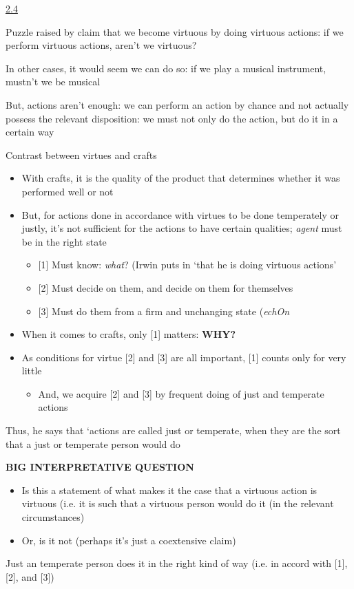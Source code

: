 \documentclass[11pt]{article}
\begin{document}
\noindent\underline{2.4}
\vspace*{2mm}

\noindent Puzzle raised by claim that we become virtuous by doing virtuous actions: if we perform virtuous actions, aren't we virtuous?
\vspace*{2mm}

\noindent In other cases, it would seem we can do so: if we play a musical instrument, mustn't we be musical
\vspace*{2mm}

\noindent But, actions aren't enough: we can perform an action by chance and not actually possess the relevant disposition: we must not only do the action, but do it in a certain way
\vspace*{2mm}

\noindent Contrast between virtues and crafts

\begin{itemize}\item{With crafts, it is the quality of the product that determines whether it was performed well or not}\item{But, for actions done in accordance with virtues to be done temperately or justly, it's not sufficient for the actions to have certain qualities; \emph{agent} must be in the right state}\begin{itemize}\item{[1] Must know: \emph{what}? (Irwin puts in `that he is doing virtuous actions'}\item{[2] Must decide on them, and decide on them for themselves}\item{[3] Must do them from a firm and unchanging state (\emph{echOn}}\end{itemize}\item{When it comes to crafts, only [1] matters: \textbf{WHY?}}\item{As conditions for virtue [2] and [3] are all important, [1] counts only for very little}\begin{itemize}\item{And, we acquire [2] and [3] by frequent doing of just and temperate actions}\end{itemize}\end{itemize}

\noindent Thus, he says that `actions are called just or temperate, when they are the sort that a just or temperate person would do
\vspace*{2mm}

\noindent\textbf{BIG INTERPRETATIVE QUESTION}

\begin{itemize}\item{Is this a statement of what makes it the case that a virtuous action is virtuous (i.e. it is such that a virtuous person would do it (in the relevant circumstances)}\item{Or, is it not (perhaps it's just a coextensive claim)}\end{itemize}

\noindent Just an temperate person does it in the right kind of way (i.e. in accord with [1], [2], and [3])
\end{document}
